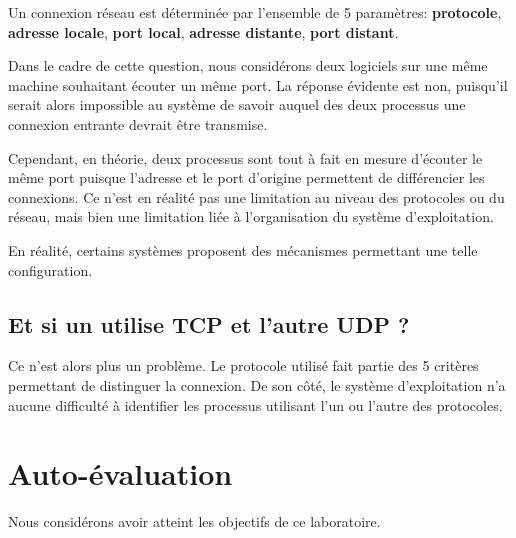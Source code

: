 \documentclass[11pt,a4paper]{article}
\begin{document}
Un connexion réseau est déterminée par l'ensemble de 5 paramètres: \textbf{protocole}, \textbf{adresse locale}, \textbf{port local}, \textbf{adresse distante}, \textbf{port distant}.

Dans le cadre de cette question, nous considérons deux logiciels sur une même machine souhaitant écouter un même port. La réponse évidente est non, puisqu'il serait alors impossible au système de savoir auquel des deux processus une connexion entrante devrait être transmise.

Cependant, en théorie, deux processus sont tout à fait en mesure d'écouter le même port puisque l'adresse et le port d'origine permettent de différencier les connexions. Ce n'est en réalité pas une limitation au niveau des protocoles ou du réseau, mais bien une limitation liée à l'organisation du système d'exploitation.

En réalité, certains systèmes proposent des mécanismes permettant une telle configuration.


\subsection{Et si un utilise TCP et l'autre UDP ?}

Ce n'est alors plus un problème. Le protocole utilisé fait partie des 5 critères permettant de distinguer la connexion. De son côté, le système d'exploitation n'a aucune difficulté à identifier les processus utilisant l'un ou l'autre des protocoles.

\section{Auto-évaluation}

Nous considérons avoir atteint les objectifs de ce laboratoire.
\end{document}
